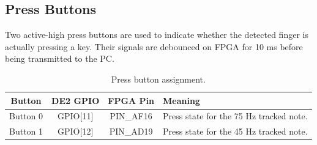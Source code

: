 \subsection{Press Buttons}

Two active-high press buttons are used to indicate whether the detected finger is actually pressing a key. Their signals are debounced on FPGA for 10 ms before being transmitted to the PC.

\begin{table}[H]
    \centering
    \caption{Press button assignment.}
    \label{tab:button_gpio}
    \renewcommand{\arraystretch}{1.2}
    \begin{tabular}{c c c p{6.5cm}}
        \toprule
        \textbf{Button} & \textbf{DE2 GPIO} & \textbf{FPGA Pin} & \textbf{Meaning} \\
        \midrule
        Button 0 & GPIO[11] & PIN\_AF16 & Press state for the 75 Hz tracked note. \\
        Button 1 & GPIO[12] & PIN\_AD19 & Press state for the 45 Hz tracked note. \\
        \bottomrule
    \end{tabular}
\end{table}

